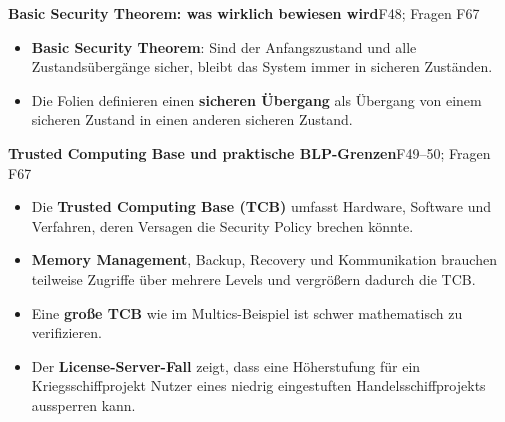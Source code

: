 \documentclass[11pt,a4paper]{article}
\newcommand{\block}[2]{\par\vspace{5pt}\textbf{#1}\hfill{\scriptsize #2}\par\nopagebreak}
\begin{document}
\block{Basic Security Theorem: was wirklich bewiesen wird}{F48; Fragen F67}
\begin{itemize}
\item \textbf{Basic Security Theorem}: Sind der Anfangszustand und alle Zustandsübergänge sicher, bleibt das System immer in sicheren Zuständen.
\item Die Folien definieren einen \textbf{sicheren Übergang} als Übergang von einem sicheren Zustand in einen anderen sicheren Zustand.
\end{itemize}
\block{Trusted Computing Base und praktische BLP-Grenzen}{F49--50; Fragen F67}
\begin{itemize}
\item Die \textbf{Trusted Computing Base (TCB)} umfasst Hardware, Software und Verfahren, deren Versagen die Security Policy brechen könnte.
\item \textbf{Memory Management}, Backup, Recovery und Kommunikation brauchen teilweise Zugriffe über mehrere Levels und vergrößern dadurch die TCB.
\item Eine \textbf{große TCB} wie im Multics-Beispiel ist schwer mathematisch zu verifizieren.
\item Der \textbf{License-Server-Fall} zeigt, dass eine Höherstufung für ein Kriegsschiffprojekt Nutzer eines niedrig eingestuften Handelsschiffprojekts aussperren kann.
\end{itemize}

\newpage
\end{document}
